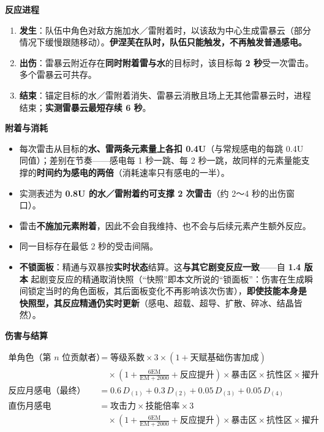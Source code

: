 \indent\textbf{反应进程} 

\begin{enumerate}
\item \textbf{发生}：队伍中角色对敌方施加水／雷附着时，以该敌为中心生成雷暴云（部分情况下缓慢跟随移动）。\textbf{伊涅芙在队时，队伍只能触发，不再触发普通感电。}
\item \textbf{出伤}：雷暴云附近存在\textbf{同时附着雷与水}的目标时，该目标每 \textbf{2 秒}受一次雷击。多个雷暴云可共存。
\item \textbf{结束}：锚定目标的水／雷附着消失、雷暴云消散且场上无其他雷暴云时，进程结束；\textbf{实测雷暴云最短存续 6 秒}。
\end{enumerate}

\indent\textbf{附着与消耗} 

\begin{itemize}
\item 每次雷击从目标的\textbf{水、雷两条元素量上各扣 0.4U}（与常规感电的每跳 0.4U 同值）；差别在节奏——感电每 1 秒一跳、每 2 秒一跳，故同样的元素量能支撑的\textbf{时间约为感电的两倍}（消耗速率只有感电的一半）。
\item 实测表述为 \textbf{0.8U 的水／雷附着约可支撑 2 次雷击}（约 2～4 秒的出伤窗口）。
\item 雷击\textbf{不施加元素附着}，因此不会自我维持、也不会与后续元素产生额外反应。
\item 同一目标存在最低 2 秒的受击间隔。
\item {}\textbf{不锁面板}：精通与双暴按\textbf{实时状态}结算。这\textbf{与其它剧变反应一致}——自 \textbf{1.4 版本} 起剧变反应的精通取消快照（“快照”即本文所说的“锁面板”：伤害在生成瞬间锁定当时的角色面板，其后面板变化不再影响该次伤害），\textbf{即使技能本身是快照型，其反应精通仍实时更新}（感电、超载、超导、扩散、碎冰、结晶皆然）。\srcmark
\end{itemize}

\indent\textbf{伤害与结算} 

\[
\begin{aligned}
\text{单角色（第 } n \text{ 位贡献者）} &= \text{等级系数} \times 3 \times (1 + \text{天赋基础伤害加成}) \\
&\quad \times \left(1 + \frac{6\text{EM}}{\text{EM}+2000} + \text{反应提升}\right) \times \text{暴击区} \times \text{抗性区} \times \text{擢升} \\
\text{反应月感电（最终）} &= 0.6\,D_{(1)} + 0.3\,D_{(2)} + 0.05\,D_{(3)} + 0.05\,D_{(4)} \\
\text{直伤月感电} &= \text{攻击力} \times \text{技能倍率} \times 3 \\
&\quad \times \left(1 + \frac{6\text{EM}}{\text{EM}+2000} + \text{反应提升}\right) \times \text{暴击区} \times \text{抗性区} \times \text{擢升}
\end{aligned}
\]


